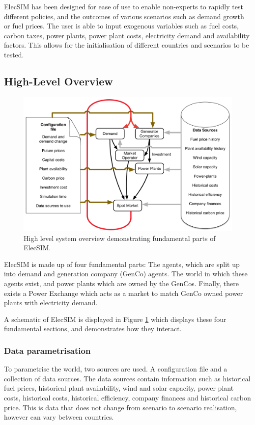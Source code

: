 
ElecSIM has been designed for ease of use to enable non-experts to rapidly test different policies, and the outcomes of various scenarios such as demand growth or fuel prices. The user is able to input exogenous variables such as fuel costs, carbon taxes, power plants, power plant costs, electricity demand and availability factors. This allows for the initialisation of different countries and scenarios to be tested.


\subsection{High-Level Overview}

\begin{figure}
	\centering
	\includegraphics[width=0.97\linewidth]{figures/System_overview}
	\caption{High level system overview demonstrating fundamental parts of ElecSIM.}
	\label{fig:systemoverview}
\end{figure}




ElecSIM is made up of four fundamental parts: The agents, which are split up into demand and generation company (GenCo) agents. The world in which these agents exist, and power plants which are owned by the GenCos. Finally, there exists a Power Exchange which acts as a market to match GenCo owned power plants with electricity demand.

A schematic of ElecSIM is displayed in Figure \ref{fig:systemoverview} which displays these four fundamental sections, and demonstrates how they interact.

\subsubsection{Data parametrisation} To parametrise the world, two sources are used. A configuration file and a collection of data sources. The data sources contain information such as historical fuel prices, historical plant availability, wind and solar capacity, power plant costs, historical costs, historical efficiency, company finances and historical carbon price. This is data that does not change from scenario to scenario realisation, however can vary between countries.

